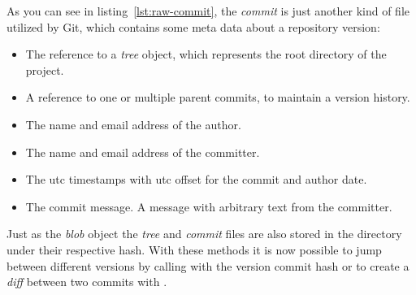 As you can see in listing~\ref{lst:raw-commit}, the \emph{commit} is just another kind of file utilized by Git, which contains some meta data about a repository version:

\begin{itemize}
    \item The reference to a \emph{tree} object, which represents the root directory of the project.
    \item A reference to one or multiple parent commits, to maintain a version history.
    \item The name and email address of the author.
    \item The name and email address of the committer.
    \item The \ac{utc} timestamps with \ac{utc} offset for the commit and author date.
    \item The commit message. A message with arbitrary text from the committer.
\end{itemize}

Just as the \emph{blob} object the \emph{tree} and \emph{commit} files are also stored in the  directory under their respective hash.
With these methods it is now possible to jump between different versions by calling  with the version commit hash or to create a \emph{diff} between two commits with .
